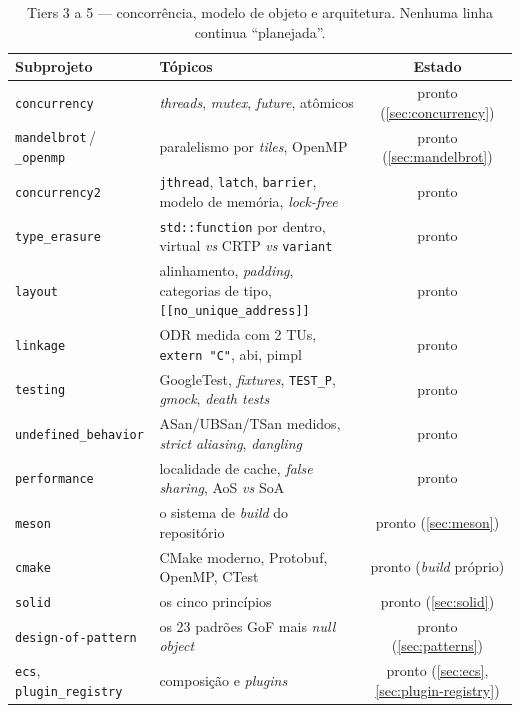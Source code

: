 \begin{table}[htbp]
\centering
\caption{Tiers 3 a 5 --- concorrência, modelo de objeto e arquitetura. Nenhuma
         linha continua ``planejada''.}
\label{tab:tier345}
\footnotesize
\begin{tabular}{@{}llc@{}}
\toprule
\textbf{Subprojeto} & \textbf{Tópicos} & \textbf{Estado} \\
\midrule
\texttt{concurrency}       & \emph{threads}, \emph{mutex}, \emph{future}, atômicos & pronto (\ref{sec:concurrency}) \\
\texttt{mandelbrot}\,/\,\texttt{\_openmp} & paralelismo por \emph{tiles}, OpenMP & pronto (\ref{sec:mandelbrot}) \\
\texttt{concurrency2}      & \texttt{jthread}, \texttt{latch}, \texttt{barrier}, modelo de memória, \emph{lock-free} & pronto \\
\midrule
\texttt{type\_erasure}     & \texttt{std::function} por dentro, virtual \emph{vs} CRTP \emph{vs} \texttt{variant} & pronto \\
\texttt{layout}            & alinhamento, \emph{padding}, categorias de tipo, \texttt{[[no\_unique\_address]]} & pronto \\
\texttt{linkage}           & ODR medida com 2 TUs, \texttt{extern "C"}, \gls{abi}, pimpl & pronto \\
\texttt{testing}           & GoogleTest, \emph{fixtures}, \texttt{TEST\_P}, \emph{gmock}, \emph{death tests} & pronto \\
\texttt{undefined\_behavior}& ASan/UBSan/TSan medidos, \emph{strict aliasing}, \emph{dangling} & pronto \\
\texttt{performance}       & localidade de cache, \emph{false sharing}, AoS \emph{vs} SoA & pronto \\
\texttt{meson}             & o sistema de \emph{build} do repositório & pronto (\ref{sec:meson}) \\
\texttt{cmake}             & CMake moderno, Protobuf, OpenMP, CTest & pronto (\emph{build} próprio) \\
\midrule
\texttt{solid}             & os cinco princípios & pronto (\ref{sec:solid}) \\
\texttt{design-of-pattern} & os 23 padrões GoF mais \emph{null object} & pronto (\ref{sec:patterns}) \\
\texttt{ecs}, \texttt{plugin\_registry} & composição e \emph{plugins} & pronto (\ref{sec:ecs}, \ref{sec:plugin-registry}) \\
\bottomrule
\end{tabular}
\end{table}


